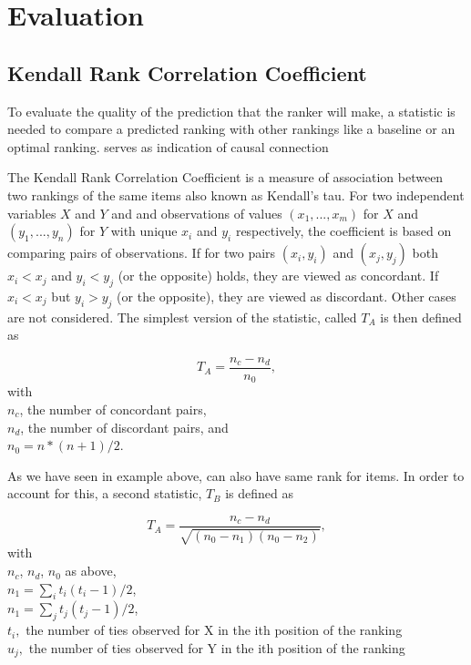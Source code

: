 
\section{Evaluation}

\subsection{Kendall Rank Correlation Coefficient}
To evaluate the quality of the prediction that the ranker will make, a statistic is needed to compare a predicted ranking with other rankings like a baseline or an optimal ranking.  serves as indication of causal connection

The Kendall Rank Correlation Coefficient is a measure of association between two rankings of the same items also known as Kendall's tau. For two independent variables $X$ and $Y$ and and observations of values $(x_1,...,x_m)$ for $X$ and $(y_1,...,y_n)$ for $Y$ with unique $x_i$ and $y_i$ respectively, the coefficient is based on comparing pairs of observations. If for two pairs $(x_i,y_i)$ and $(x_j,y_j)$ both $x_i < x_j$ and $y_i < y_j$ (or the opposite) holds, they are viewed as concordant. If $x_i < x_j$ but $y_i > y_j$ (or the opposite), they are viewed as discordant. Other cases are not considered. The simplest version of the statistic, called $T_A$ is then defined as 

$$T_A = \frac{n_c - n_d}{n_0},$$
with \\
$n_c$, the number of concordant pairs, \\
$n_d$, the number of discordant pairs, and \\
$n_0 = n * (n + 1) / 2$.

As we have seen in example above, can also have same rank for items. In order to account for this, a second statistic, $T_B$ is defined as

$$T_A = \frac{n_c - n_d}{\sqrt{(n_0 - n_1 )(n_0 - n_2 )}},$$
with \\
$n_c$, $n_d$, $n_0$ as above, \\
$n_1=\sum_i{t_i(t_i-1)/2}$, \\
$n_1=\sum_j{t_j(t_j-1)/2}$, \\
$t_i,$ the number of ties observed for X in the ith position of the ranking \\
$u_j,$ the number of ties observed for Y in the ith position of the ranking 

